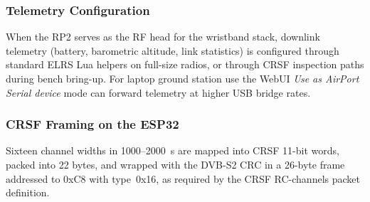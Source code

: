 \subsubsection{Telemetry Configuration}
\label{subsubsec:telemetry}

When the RP2 serves as the RF head for the wristband stack, downlink telemetry (battery, barometric
altitude, link statistics) is configured through standard ELRS Lua helpers on full-size radios, or
through CRSF inspection paths during bench bring-up.
For laptop ground station use the WebUI \emph{Use as AirPort Serial device} mode can forward
telemetry at higher USB bridge rates.

\subsubsection{CRSF Framing on the ESP32}
\label{subsubsec:crsf-fw}

Sixteen channel widths in 1000--2000~\textmu s are mapped into CRSF 11-bit words, packed into 22 bytes,
and wrapped with the DVB-S2 CRC in a 26-byte frame addressed to 0xC8 with type~0x16, as required
by the CRSF RC-channels packet definition.
